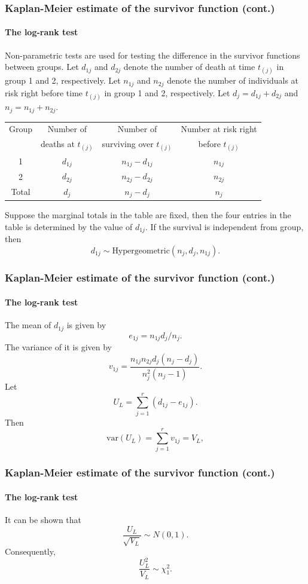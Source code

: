\documentclass{beamer}
\begin{document}
	\begin{frame}
		\frametitle{Kaplan-Meier estimate of the survivor function (cont.)}
		\framesubtitle{The log-rank test}
		Non-parametric tests are used for testing the difference in the survivor functions between groups. Let $d_{ 1j }$ and $d_{ 2j }$ denote the number of death at time $t_{ ( j ) }$ in group 1 and 2, respectively. Let $n_{ 1j }$ and $n_{ 2j }$ denote the number of individuals at risk right before time $t_{ ( j ) }$ in group 1 and 2, respectively. Let $d_j = d_{ 1j } + d_{ 2j }$ and $n_j = n_{ 1j } + n_{ 2j }$.
		\begin{tabular}{cccc}
			\hline\hline
			Group & Number of  & Number of & Number at risk right \\
		
			& deaths at $t_{ ( j ) }$ & surviving over $t_{ ( j ) }$ & before $t_{ ( j ) }$ \\
			\hline
			1 & $d_{ 1j }$ & $n_{ 1j } - d_{ 1j }$ & $n_{ 1j }$ \\
			2  & $d_{ 2j }$ & $n_{ 2j } - d_{ 2j }$ & $n_{ 2j }$ \\
			\hline
			Total & $d_{ j }$ & $n_j - d_j$  & $n_j$ \\
			\hline\hline
		\end{tabular}
	Suppose the marginal totals in the table are fixed, then the four entries in the table is determined by the value of $d_{ 1j }$. If the survival is independent from group, then
	\[ d_{ 1j } \sim \text{Hypergeometric}( n_j, d_j, n_{ 1j } ).\]
	\end{frame}
	
	\begin{frame}
		\frametitle{Kaplan-Meier estimate of the survivor function (cont.)}
		\framesubtitle{The log-rank test}
		The mean of $d_{ 1j }$ is given by
		\[ e_{ 1j } = n_{ 1j } d_j / n_j. \]
		The variance of it is given by
		\[ v_{ 1j } = \frac{ n_{ 1j } n_{ 2j } d_j( n_j - d_j ) }{ n_j^2( n_j - 1 ) }.\]
		Let 
		\[ U_L = \sum_{ j = 1 }^{ r }( d_{ 1j } - e_{ 1j } ). \]
		Then 
		\[ \text{var}( U_L ) = \sum_{ j = 1 }^{ r } v_{ 1j } = V_L, \]
	\end{frame}
	
	\begin{frame}
		\frametitle{Kaplan-Meier estimate of the survivor function (cont.)}
		\framesubtitle{The log-rank test}
		It can be shown that 
		\[ \frac{ U_L }{ \sqrt{ V_L } } \sim N( 0, 1 ). \]
		Consequently,
		\[ \frac{ U_L^2 }{ V_L } \sim \chi_1^2. \]
	\end{frame}
	
\end{document}
